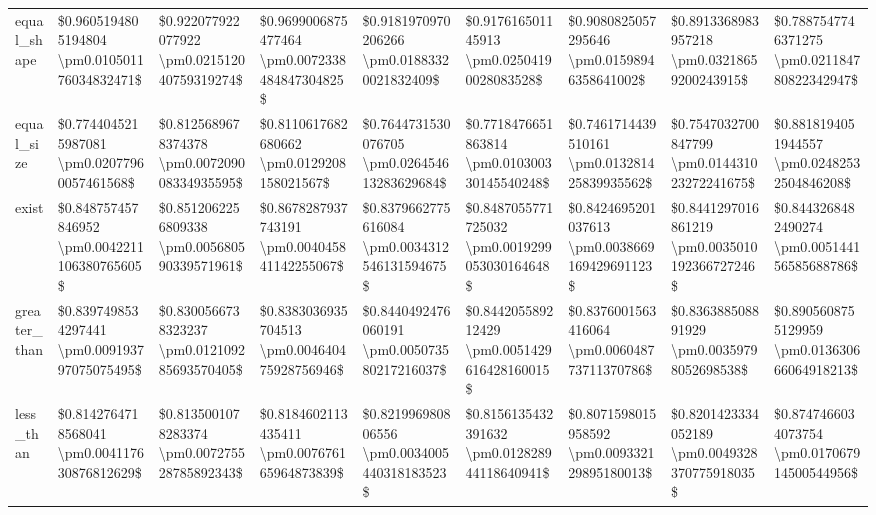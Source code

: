 \begin{tabular}{lllllllll}
equal\_shape    &    \$0.9605194805194804 \textbackslash pm0.010501176034832471\$ &   \$0.922077922077922 \textbackslash pm0.021512040759319274\$ &  \$0.9699006875477464 \textbackslash pm0.0072338484847304825\$ &    \$0.9181970970206266 \textbackslash pm0.01883320021832409\$ &     \$0.917616501145913 \textbackslash pm0.02504190028083528\$ &    \$0.9080825057295646 \textbackslash pm0.01598946358641002\$ &    \$0.8913368983957218 \textbackslash pm0.03218659200243915\$ &  \$0.7887547746371275 \textbackslash pm0.021184780822342947\$ \\
equal\_size     &     \$0.7744045215987081 \textbackslash pm0.02077960057461568\$ &  \$0.8125689678374378 \textbackslash pm0.007209008334935595\$ &     \$0.8110617682680662 \textbackslash pm0.0129208158021567\$ &   \$0.7644731530076705 \textbackslash pm0.026454613283629684\$ &   \$0.7718476651863814 \textbackslash pm0.010300330145540248\$ &   \$0.7461714439510161 \textbackslash pm0.013281425839935562\$ &   \$0.7547032700847799 \textbackslash pm0.014431023272241675\$ &   \$0.8818194051944557 \textbackslash pm0.02482532504846208\$ \\
exist          &    \$0.848757457846952 \textbackslash pm0.0042211106380765605\$ &  \$0.8512062256809338 \textbackslash pm0.005680590339571961\$ &   \$0.8678287937743191 \textbackslash pm0.004045841142255067\$ &  \$0.8379662775616084 \textbackslash pm0.0034312546131594675\$ &  \$0.8487055771725032 \textbackslash pm0.0019299053030164648\$ &  \$0.8424695201037613 \textbackslash pm0.0038669169429691123\$ &  \$0.8441297016861219 \textbackslash pm0.0035010192366727246\$ &  \$0.8443268482490274 \textbackslash pm0.005144156585688786\$ \\
greater\_than   &    \$0.8397498534297441 \textbackslash pm0.009193797075075495\$ &  \$0.8300566738323237 \textbackslash pm0.012109285693570405\$ &   \$0.8383036935704513 \textbackslash pm0.004640475928756946\$ &   \$0.8440492476060191 \textbackslash pm0.005073580217216037\$ &   \$0.844205589212429 \textbackslash pm0.0051429616428160015\$ &   \$0.8376001563416064 \textbackslash pm0.006048773711370786\$ &     \$0.836388508891929 \textbackslash pm0.00359798052698538\$ &  \$0.8905608755129959 \textbackslash pm0.013630666064918213\$ \\
less\_than      &    \$0.8142764718568041 \textbackslash pm0.004117630876812629\$ &  \$0.8135001078283374 \textbackslash pm0.007275528785892343\$ &   \$0.8184602113435411 \textbackslash pm0.007676165964873839\$ &   \$0.821996980806556 \textbackslash pm0.0034005440318183523\$ &   \$0.8156135432391632 \textbackslash pm0.012828944118640941\$ &   \$0.8071598015958592 \textbackslash pm0.009332129895180013\$ &  \$0.8201423334052189 \textbackslash pm0.0049328370775918035\$ &  \$0.8747466034073754 \textbackslash pm0.017067914500544956\$ \\

\end{tabular}

